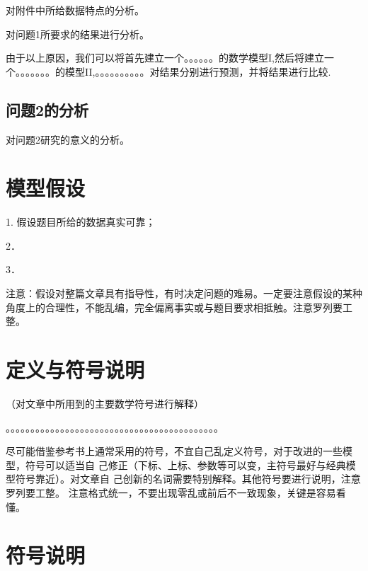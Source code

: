 \documentclass[bwprint]{gmcmthesis}
\begin{document}
对附件中所给数据特点的分析。

对问题1所要求的结果进行分析。

由于以上原因，我们可以将首先建立一个。。。。。。的数学模型I,然后将建立一个。。。。。。。的模型II,。。。。。。。。。。对结果分别进行预测，并将结果进行比较.


\subsection{问题2的分析}


对问题2研究的意义的分析。



\section{模型假设}

1.	假设题目所给的数据真实可靠；

2．

3．
 
 

 注意：假设对整篇文章具有指导性，有时决定问题的难易。一定要注意假设的某种角度上的合理性，不能乱编，完全偏离事实或与题目要求相抵触。注意罗列要工整。
 
\section{定义与符号说明}
（对文章中所用到的主要数学符号进行解释）

。。。。。。。。。。。。。。。。。。。。。。。。。。。。。。。。。。。。。。。。。。。

尽可能借鉴参考书上通常采用的符号，不宜自己乱定义符号，对于改进的一些模型，符号可以适当自
己修正（下标、上标、参数等可以变，主符号最好与经典模型符号靠近）。对文章自
己创新的名词需要特别解释。其他符号要进行说明，注意罗列要工整。
注意格式统一，不要出现零乱或前后不一致现象，关键是容易看懂。


\section{符号说明}
\end{document}
